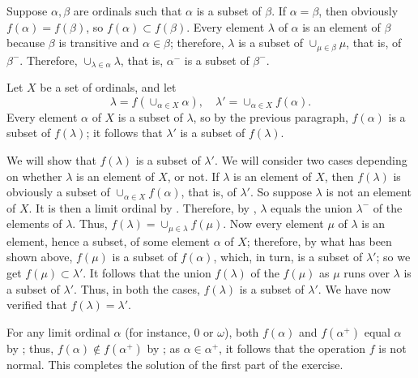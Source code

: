 \documentclass{article}
\begin{document}
\begin{solution}[\ref{exe:wezu6n6e}]
  \label{sol:br9halkv}
  Suppose \(\alpha, \beta\) are ordinals such that \(\alpha\) is a
  subset of \(\beta\).  If \(\alpha = \beta\), then obviously
  \(f(\alpha) = f(\beta)\), so \(f(\alpha) \subset f(\beta)\).  Every
  element \(\lambda\) of \(\alpha\) is an element of \(\beta\) because
  \(\beta\) is transitive and \(\alpha \in \beta\); therefore,
  \(\lambda\) is a subset of \(\cup_{\mu \in \beta} \mu\), that is, of
  \(\beta^-\).  Therefore, \(\cup_{\lambda \in \alpha} \lambda\), that
  is, \(\alpha^-\) is a subset of \(\beta^-\).

  Let \(X\) be a set of ordinals, and let
  \begin{displaymath}
    \lambda = f(\cup_{\alpha \in X} \alpha),
    \quad
    \lambda' = \cup_{\alpha \in X} f(\alpha).
  \end{displaymath}
  Every element \(\alpha\) of \(X\) is a subset of \(\lambda\), so by
  the previous paragraph, \(f(\alpha)\) is a subset of \(f(\lambda)\);
  it follows that \(\lambda'\) is a subset of \(f(\lambda)\).

  We will show that \(f(\lambda)\) is a subset of \(\lambda'\).  We
  will consider two cases depending on whether \(\lambda\) is an
  element of \(X\), or not.  If \(\lambda\) is an element of \(X\),
  then \(f(\lambda)\) is obviously a subset of
  \(\cup_{\alpha \in X} f(\alpha)\), that is, of \(\lambda'\).  So
  suppose \(\lambda\) is not an element of \(X\).  It is then a limit
  ordinal by .  Therefore, by ,
  \(\lambda\) equals the union \(\lambda^-\) of the elements of
  \(\lambda\).  Thus, \(f(\lambda) = \cup_{\mu \in \lambda} f(\mu)\).
  Now every element \(\mu\) of \(\lambda\) is an element, hence a
  subset, of some element \(\alpha\) of \(X\); therefore, by what has
  been shown above, \(f(\mu)\) is a subset of \(f(\alpha)\), which, in
  turn, is a subset of \(\lambda'\); so we get
  \(f(\mu) \subset \lambda'\).  It follows that the union
  \(f(\lambda)\) of the \(f(\mu)\) as \(\mu\) runs over \(\lambda\) is
  a subset of \(\lambda'\).  Thus, in both the cases, \(f(\lambda)\)
  is a subset of \(\lambda'\).  We have now verified that
  \(f(\lambda) = \lambda'\).

  For any limit ordinal \(\alpha\) (for instance, \(0\) or
  \(\omega\)), both \(f(\alpha)\) and \(f(\alpha^+)\) equal \(\alpha\)
  by ; thus, \(f(\alpha) \notin f(\alpha^+)\) by
  ; as \(\alpha \in \alpha^+\), it follows that the
  operation \(f\) is not normal.  This completes the solution of the
  first part of the exercise.


\end{solution}
\end{document}
